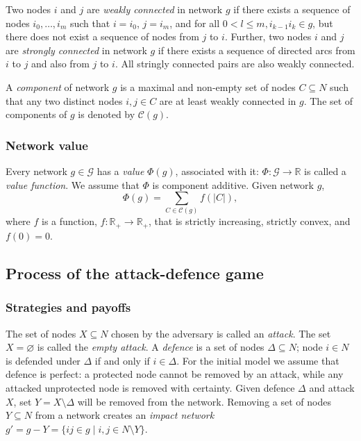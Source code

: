 \documentclass[11pt,fleqn]{article}
\begin{document}
Two nodes $i$ and $j$ are \emph{weakly connected} in network $g$ if there exists a sequence of nodes $i_{0}, \ldots, i_{m}$ such that $i = i_{0}$, $j = i_{m}$, and for all $0 < l \leq m, i_{k-1}i_{k} \in g$, but there does not exist a sequence of nodes from $j$ to $i$. Further, two nodes $i$ and $j$ are \emph{strongly connected} in network $g$ if there exists a sequence of directed arcs from $i$ to $j$ and also from $j$ to $i$. All stringly connected pairs are also weakly connected.

A \emph{component} of network $g$ is a maximal and non-empty  set of nodes $C \subseteq N$ such that any two distinct nodes $i, j \in C$ are at least weakly connected in $g$. The set of components of $g$ is denoted by $\mathcal{C}(g)$.

\subsubsection{Network value}

Every network $g \in \mathcal{G}$ has a \emph{value} $\Phi(g)$, associated with it: $\Phi : \mathcal{G} \longrightarrow \mathbb{R}$ is called a \emph{value function}. We assume that $\Phi$ is component additive. Given network $g$,
\begin{equation}
\Phi(g) = \sum_{C \in \mathcal{C}(g)} f(|C|),
\end{equation}
where $f$ is a function, $f : \mathbb{R}_{+} \longrightarrow \mathbb{R}_{+}$, that is strictly increasing, strictly convex, and $f(0) = 0$.

\subsection{Process of the attack-defence game}
\label{subsec:processOfGame}
\subsubsection{Strategies and payoffs}

The set of nodes $X \subseteq N$ chosen by the adversary is called an \emph{attack}. The set $X = \varnothing$ is called the \emph{empty attack}. A \emph{defence} is a set of nodes $\Delta \subseteq N$; node $i \in N$ is defended under $\Delta$ if and only if $i \in \Delta$. For the initial model we assume that defence is perfect: a protected node cannot be removed by an attack, while any attacked unprotected node is removed with certainty. Given defence $\Delta$ and attack $X$, set $Y = X \setminus \Delta$ will be removed from the network. Removing a set of nodes $Y \subseteq N$ from a network creates an \emph{impact network} $g' = g - Y = \{ ij \in g \mid i,j \in N \setminus Y \}$.
\end{document}
